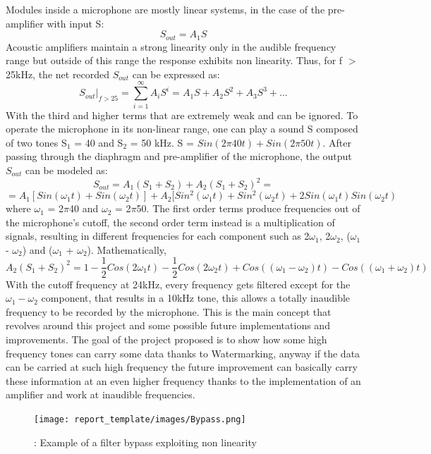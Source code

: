 Modules inside a microphone are mostly linear systems, in the case of the pre-amplifier with input S:
\[ S_{out} = A_1S\]
Acoustic amplifiers maintain a strong linearity only in the audible frequency range but outside of this range the response exhibits non linearity. Thus, for f $>$ 25kHz, the net recorded $S_{out}$ can be expressed as:
\[S_{out}\Bigg|_{f>25} = \sum_{i=1}^{\infty}A_iS^i=A_1S+A_2S^2+A_3S^3+...\]
With the third and higher terms that are extremely weak and can be ignored.
\newpage
To operate the microphone in its non-linear range, one can play a sound S composed of two tones S$_1$ = 40 and S$_2$ = 50 kHz.
S = $Sin(2\pi40t)+Sin(2\pi50t)$.
After passing through the diaphragm and pre-amplifier of the microphone, the output $S_{out}$ can be modeled as:
\[S_{out}= A_1(S_1 + S_2) + A_2(S_1 + S_2)^2 =\] \[ = A_1[Sin(\omega_1t) + Sin(\omega_2t)] + A_2 [Sin^2(\omega_1t) + Sin^2(\omega_2t) + 2Sin(\omega_1t)Sin(\omega_2t)\]
where $\omega_1$ = 2$\pi$40 and $\omega_2$ = 2$\pi$50.
\newline
The first order terms produce frequencies out of the microphone's cutoff, the second order term  instead is a multiplication of signals, resulting in different frequencies for each component such as 2$\omega_1$, 2$\omega_2$, ($\omega_1$ - $\omega_2$) and ($\omega_1$ + $\omega_2$). Mathematically, 
\[ A_2(S_1 + S_2)^2 = 1 - \frac{1}{2}Cos(2\omega_1t) - \frac{1}{2}Cos(2\omega_2t) + Cos((\omega_1 - \omega_2)t) - Cos((\omega_1 + \omega_2)t)\]
With the cutoff frequency at 24kHz, every frequency gets filtered except for the $\omega_1 - \omega_2$ component, that results in a 10kHz tone, this allows a totally inaudible frequency to be recorded by the microphone.
This is the main concept that revolves around this project and some possible future implementations and improvements. \cite{backdoor}
\newline
The goal of the project proposed is to show how some high frequency tones can carry some data thanks to Watermarking, anyway if the data can be carried at such high frequency the future improvement can basically carry these information at an even higher frequency thanks to the implementation of an amplifier and work at inaudible frequencies.
\newline
 \begin{figure}[H]
    \centering
    \texttt{[image: report\_template/images/Bypass.png]}
    \caption{: Example of a filter bypass exploiting non linearity}
    \label{fig:market}
\end{figure}

